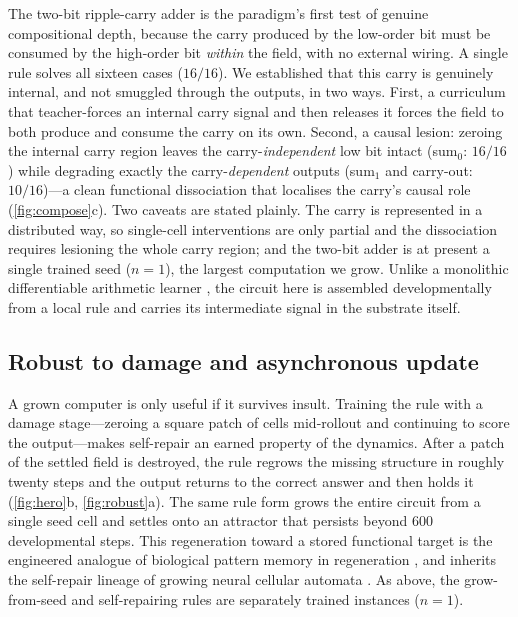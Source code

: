 The two-bit ripple-carry adder is the paradigm's first test of genuine compositional depth, because the carry produced by the low-order bit must be consumed by the high-order bit \emph{within} the field, with no external wiring. A single rule solves all sixteen cases ($16/16$). We established that this carry is genuinely internal, and not smuggled through the outputs, in two ways. First, a curriculum that teacher-forces an internal carry signal and then releases it forces the field to both produce and consume the carry on its own. Second, a causal lesion: zeroing the internal carry region leaves the carry-\emph{independent} low bit intact (sum$_0$: $16/16$) while degrading exactly the carry-\emph{dependent} outputs (sum$_1$ and carry-out: $10/16$)---a clean functional dissociation that localises the carry's causal role (\ref{fig:compose}c). Two caveats are stated plainly. The carry is represented in a distributed way, so single-cell interventions are only partial and the dissociation requires lesioning the whole carry region; and the two-bit adder is at present a single trained seed ($n=1$), the largest computation we grow. Unlike a monolithic differentiable arithmetic learner \citep{kaiser2016neuralgpu}, the circuit here is assembled developmentally from a local rule and carries its intermediate signal in the substrate itself.

\subsection{Robust to damage and asynchronous update}

A grown computer is only useful if it survives insult. Training the rule with a damage stage---zeroing a square patch of cells mid-rollout and continuing to score the output---makes self-repair an earned property of the dynamics. After a patch of the settled field is destroyed, the rule regrows the missing structure in roughly twenty steps and the output returns to the correct answer and then holds it (\ref{fig:hero}b, \ref{fig:robust}a). The same rule form grows the entire circuit from a single seed cell and settles onto an attractor that persists beyond $600$ developmental steps. This regeneration toward a stored functional target is the engineered analogue of biological pattern memory in regeneration \citep{durant2017longterm}, and inherits the self-repair lineage of growing neural cellular automata \citep{mordvintsev2020growing}. As above, the grow-from-seed and self-repairing rules are separately trained instances ($n=1$).

